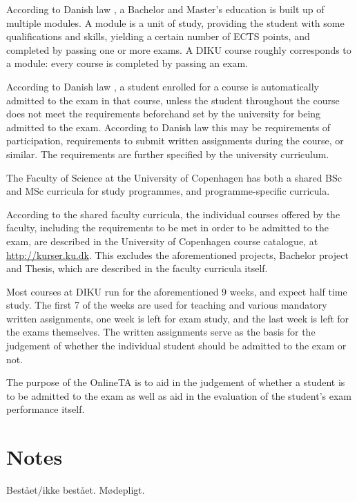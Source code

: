 According to Danish law \cite[, parts 1 \& 2]{bek814}, a
Bachelor and Master's education is built up of multiple modules. A module is
a unit of study, providing the student with some qualifications and skills,
yielding a certain number of ECTS points, and completed by passing one or more
exams. A DIKU course roughly corresponds to a module: every course is completed
by passing an exam.

According to Danish law \cite[, parts 1 \& 4]{bek666}, a
student enrolled for a course is automatically admitted to the exam in that
course, unless the student throughout the course does not meet the requirements
beforehand set by the university for being admitted to the exam. According to
Danish law \cite[, parts 2 \& 3]{bek666} this may be
requirements of participation, requirements to submit written assignments
during the course, or similar. The requirements are further specified by the
university curriculum.

The Faculty of Science at the University of Copenhagen has both a shared BSc
and MSc curricula for study programmes\cite{faelles-del-ENG}, and
programme-specific curricula.

According to the shared faculty curricula, the individual courses offered by
the faculty, including the requirements to be met in order to be admitted to
the exam, are described in the University of Copenhagen course catalogue, at
\url{http://kurser.ku.dk}. This excludes the aforementioned projects, Bachelor
project and Thesis, which are described in the faculty curricula itself.

Most courses at DIKU run for the aforementioned 9 weeks, and expect half time
study. The first 7 of the weeks are used for teaching and various mandatory
written assignments, one week is left for exam study, and the last week is left
for the exams themselves. The written assignments serve as the basis for the
judgement of whether the individual student should be admitted to the exam or
not.

The purpose of the OnlineTA is to aid in the judgement of whether a student is
to be admitted to the exam as well as aid in the evaluation of the student's
exam performance itself.

\section{Notes}

Bestået/ikke bestået. Mødepligt.

